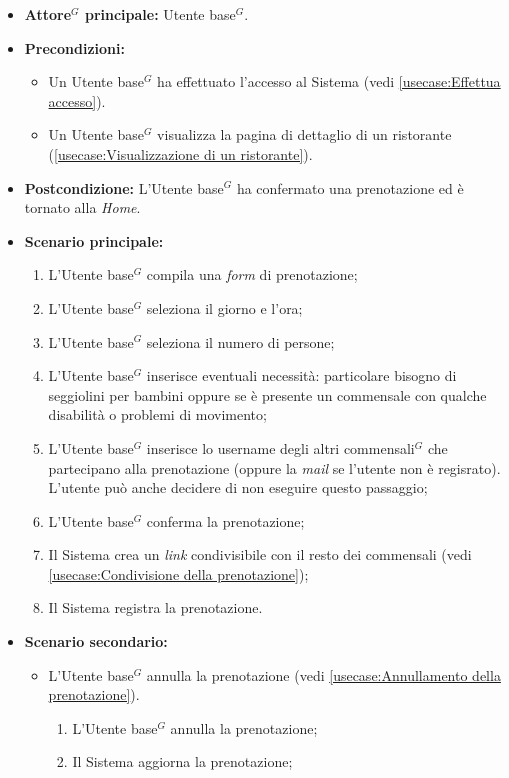 \label{usecase:Prenotazione di un tavolo}
\begin{itemize}
	\item \textbf{\gls{Attore}$^G$ principale:} \gls{Utente base}$^G$.
	\item \textbf{Precondizioni:}
	      \begin{itemize}
		      \item Un \gls{Utente base}$^G$ ha effettuato l'accesso al Sistema (vedi \autoref{usecase:Effettua accesso}).
		      \item Un \gls{Utente base}$^G$ visualizza la pagina di dettaglio di un ristorante (\autoref{usecase:Visualizzazione di un ristorante}).
	      \end{itemize}
	\item \textbf{Postcondizione:} L'\gls{Utente base}$^G$ ha confermato una prenotazione ed è tornato alla \textit{Home}.


	\item \textbf{Scenario principale:}
	      \begin{enumerate}
		      \item L'\gls{Utente base}$^G$ compila una \textit{form} di prenotazione;
		      \item L'\gls{Utente base}$^G$ seleziona il giorno e l'ora;
		      \item L'\gls{Utente base}$^G$ seleziona il numero di persone;
		      \item L'\gls{Utente base}$^G$ inserisce eventuali necessità: particolare bisogno di seggiolini per bambini oppure se è presente un commensale con qualche disabilità o problemi di movimento;
		      \item L'\gls{Utente base}$^G$ inserisce lo username degli altri commensali$^G$  che partecipano alla prenotazione (oppure la \textit{mail} se l'utente non è regisrato).
		            L'utente può anche decidere di non eseguire questo passaggio;
		      \item L'\gls{Utente base}$^G$ conferma la prenotazione;
		      \item Il Sistema crea un \textit{link} condivisibile con il resto dei commensali (vedi \autoref{usecase:Condivisione della prenotazione});
		      \item Il Sistema registra la prenotazione.

	      \end{enumerate}

	\item \textbf{Scenario secondario:}
	      \begin{itemize}
		      \item L'\gls{Utente base}$^G$ annulla la prenotazione (vedi
		            \autoref{usecase:Annullamento della prenotazione}).
		            \begin{enumerate}
			            \item L'\gls{Utente base}$^G$ annulla la prenotazione;
			            \item Il Sistema aggiorna la prenotazione;
		            \end{enumerate}
	      \end{itemize}
\end{itemize}

